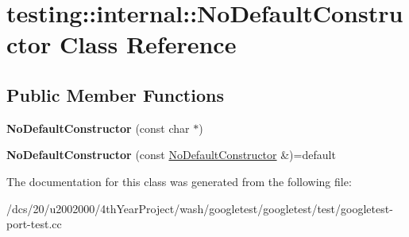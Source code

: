 \hypertarget{classtesting_1_1internal_1_1NoDefaultConstructor}{}\section{testing\+:\+:internal\+:\+:No\+Default\+Constructor Class Reference}
\label{classtesting_1_1internal_1_1NoDefaultConstructor}
\subsection*{Public Member Functions}
\begin{DoxyCompactItemize}
\item 
\mbox{\label{classtesting_1_1internal_1_1NoDefaultConstructor_a1486304ce5160488b1d230c5b1bf080f}} 
{\bfseries No\+Default\+Constructor} (const char $\ast$)
\item 
\mbox{\label{classtesting_1_1internal_1_1NoDefaultConstructor_a2c18cc4d4249f7dc4eec672856853111}} 
{\bfseries No\+Default\+Constructor} (const \mbox{\hyperlink{classtesting_1_1internal_1_1NoDefaultConstructor}{No\+Default\+Constructor}} \&)=default
\end{DoxyCompactItemize}


The documentation for this class was generated from the following file\+:\begin{DoxyCompactItemize}
\item 
/dcs/20/u2002000/4th\+Year\+Project/wash/googletest/googletest/test/googletest-\/port-\/test.\+cc\end{DoxyCompactItemize}

